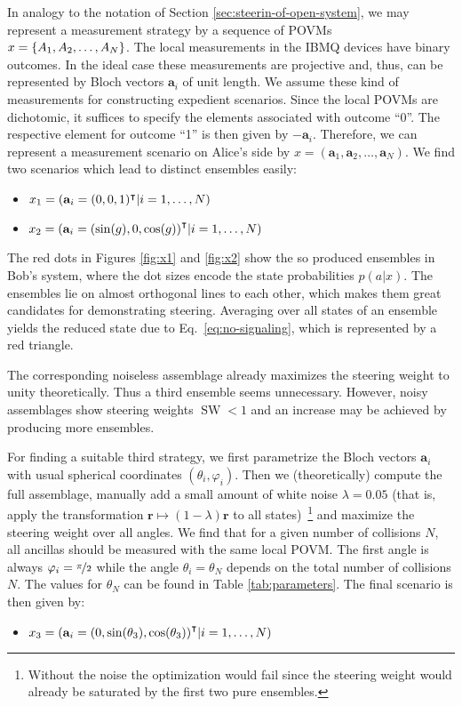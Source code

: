 \documentclass[aps,pra,twocolumn,superscriptaddress,showemail,showpacs,longbibliography]{revtex4-2}
\renewcommand{\vec}{\mathbf}
\begin{document}
In analogy to the notation of Section \ref{sec:steerin-of-open-system}, we may represent a measurement strategy by a sequence of POVMs $x = \qty{A_1, A_2, \dots, A_N}$. The local measurements in the IBMQ devices have binary outcomes. In the ideal case these measurements are projective and, thus, can be represented by Bloch vectors $\vec a_i$ of unit length. We assume these kind of measurements for constructing expedient scenarios. Since the local POVMs are dichotomic, it suffices to specify the elements associated with outcome ``0''. The respective element for outcome ``1'' is then given by $-\vec a_i$. Therefore, we can represent a measurement scenario on Alice's side by $x = (\vec{a}_1, \vec{a}_2, \dots, \vec{a}_N)$. We find two scenarios which lead to distinct ensembles easily:
\begin{itemize}
    \item $x_1 = \qty(\vec{a}_i = (0,0,1)^\intercal \vert i = 1, \dots, N)$
    \item $x_2 = \qty(\vec{a}_i = \qty(\sin(g),0,\cos(g))^\intercal \vert i = 1, \dots, N)$
\end{itemize}

The red dots in Figures \ref{fig:x1} and \ref{fig:x2} show the so produced ensembles in Bob's system, where the dot sizes encode the state probabilities $p(a|x)$. The ensembles lie on almost orthogonal lines to each other, which makes them great candidates for demonstrating steering. Averaging over all states of an ensemble yields the reduced state due to Eq.~\eqref{eq:no-signaling}, which is represented by a red triangle.

The corresponding noiseless assemblage already maximizes the steering weight to unity theoretically.
Thus a third ensemble seems unnecessary. However, noisy assemblages show steering weights $\operatorname{SW} < 1$ and an increase may be achieved by producing more ensembles. 

For finding a suitable third strategy, we first parametrize the Bloch vectors $\vec{a}_i$ with usual spherical coordinates $(\theta_i, \varphi_i)$. Then we (theoretically) compute the full assemblage, manually add a small amount of white noise $\lambda=0.05$ (that is, apply the transformation $\vec{r} \mapsto (1-\lambda) \vec{r}$ to all states)~\footnote{Without the noise the optimization would fail since the steering weight would already be saturated by the first two pure ensembles.} and maximize the steering weight over all angles. We find that for a given number of collisions $N$, all ancillas should be measured with the same local POVM. The first angle is always $\varphi_i = \nicefrac{\pi}{2}$ while the angle $\theta_i = \theta_N$ depends on the total number of collisions $N$. The values for $\theta_N$ can be found in Table \ref{tab:parameters}. The final scenario is then given by:
\begin{itemize}
    \item $x_3 = (\vec{a}_i = \qty(0,\sin(\theta_3),\cos(\theta_3))^\intercal \vert i = 1, \dots, N)$
\end{itemize}
\end{document}
